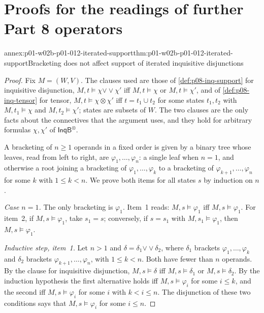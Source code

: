 \section{Proofs for the readings of further Part 8 operators}
\label{sec:annex-p01-w02b-p01-012-readings}

\begin{annexitem}{annex:p01-w02b-p01-012-iterated-support}{thm:p01-w02b-p01-012-iterated-support}{Bracketing does not affect support of iterated inquisitive disjunctions}
\begin{proof}
Fix \(M=(W,V)\).  The clauses used are those of \cref{def:p08-inq-support}
for inquisitive disjunction,
\(M,t\models\chi\mathbin{\vee\!\vee}\chi'\) iff \(M,t\models\chi\) or
\(M,t\models\chi'\), and of \cref{def:p08-inq-tensor} for tensor,
\(M,t\models\chi\otimes\chi'\) iff \(t=t_1\cup t_2\) for some states
\(t_1,t_2\) with \(M,t_1\models\chi\) and \(M,t_2\models\chi'\); states
are subsets of \(W\).  The two clauses are the only facts about the
connectives that the argument uses, and they hold for arbitrary formulas
\(\chi,\chi'\) of \(\mathsf{InqB}^{\otimes}\).

A bracketing of \(n\geq1\) operands in a fixed order is given by a binary
tree whose leaves, read from left to right, are
\(\varphi_1,\ldots,\varphi_n\): a single leaf when \(n=1\), and otherwise a
root joining a bracketing of \(\varphi_1,\ldots,\varphi_k\) to a
bracketing of \(\varphi_{k+1},\ldots,\varphi_n\) for some \(k\) with
\(1\leq k<n\).  We prove both items for all states \(s\) by induction on
\(n\).

\emph{Case \(n=1\).}  The only bracketing is \(\varphi_1\).  Item~1
reads: \(M,s\models\varphi_1\) iff \(M,s\models\varphi_1\).  For item~2,
if \(M,s\models\varphi_1\), take \(s_1=s\); conversely, if
\(s=s_1\) with \(M,s_1\models\varphi_1\), then \(M,s\models\varphi_1\).

\emph{Inductive step, item~1.}  Let \(n>1\) and
\(\delta=\delta_1\mathbin{\vee\!\vee}\delta_2\), where \(\delta_1\)
brackets \(\varphi_1,\ldots,\varphi_k\) and \(\delta_2\) brackets
\(\varphi_{k+1},\ldots,\varphi_n\), with \(1\leq k<n\).  Both have fewer
than \(n\) operands.  By the clause for inquisitive disjunction,
\(M,s\models\delta\) iff \(M,s\models\delta_1\) or \(M,s\models\delta_2\).
By the induction hypothesis the first alternative holds iff
\(M,s\models\varphi_i\) for some \(i\leq k\), and the second iff
\(M,s\models\varphi_i\) for some \(i\) with \(k<i\leq n\).  The
disjunction of these two conditions says that \(M,s\models\varphi_i\) for
some \(i\leq n\).


\end{proof}
\end{annexitem}
